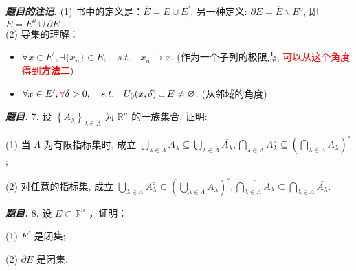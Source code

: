 \documentclass[10pt, a4paper, oneside]{ctexart}
\newenvironment{problem}{\begin{framed}\par\noindent\textbf{\textit{题目. }}}{\end{framed}\par}
\newenvironment{note}{\par\noindent\textbf{\textit{题目的注记. }}\ignorespaces}{\par}
\begin{document}
\begin{note}
    (1) 书中的定义是：$\overline{E}=E\cup E^{\prime}$, 另一种定义: $\partial E=\overline{E}\backslash E^{o}$, 即$\overline{E}=E^{o}\cup \partial E$\\
    (2) 导集的理解：
    \begin{itemize}
        \item $\forall x\in E^{\prime}, \exists \{x_n\}\in E, \quad s.t. \quad x_n \to x$. (作为一个子列的极限点, \textcolor{red}{可以从这个角度得到\textbf{\textcolor{red}{方法二}}})
        \item $\forall x\in E^{\prime}, \textcolor{red}{\forall} \delta>0, \quad s.t. \quad U_0(x,\delta)\cup E\neq \varnothing$. (从邻域的角度)
    \end{itemize}
\end{note}

\begin{problem}
7. 设 $\left\{A_\lambda\right\}_{\lambda \in \Lambda}$ 为 $\mathbb{R}^n$ 的一族集合, 证明:

(1) 当 $\Lambda$ 为有限指标集时, 成立 $\overline{\bigcup_{\lambda \in \Lambda} A_\lambda} \subseteq \bigcup_{\lambda \in \Lambda} \overline{A_\lambda}, \bigcap_{\lambda \in \Lambda} A_\lambda^{\circ} \subseteq\left(\bigcap_{\lambda \in \Lambda} A_\lambda\right)^{\circ}$;

(2) 对任意的指标集, 成立 $\bigcup_{\lambda \in \Lambda} A_\lambda^{\circ} \subseteq\left(\bigcup_{\lambda \in \Lambda} A_\lambda\right)^{\circ}, \overline{\bigcap_{\lambda \in \Lambda} A_\lambda} \subseteq \bigcap_{\lambda \in \Lambda} \overline{A_\lambda}$.
\end{problem}

\begin{problem}
8. 设 $E \subset \mathbb{R}^n$ ，证明：

(1) $E^{\prime}$ 是闭集;

(2) $\partial E$ 是闭集.
\end{problem}
\end{document}
